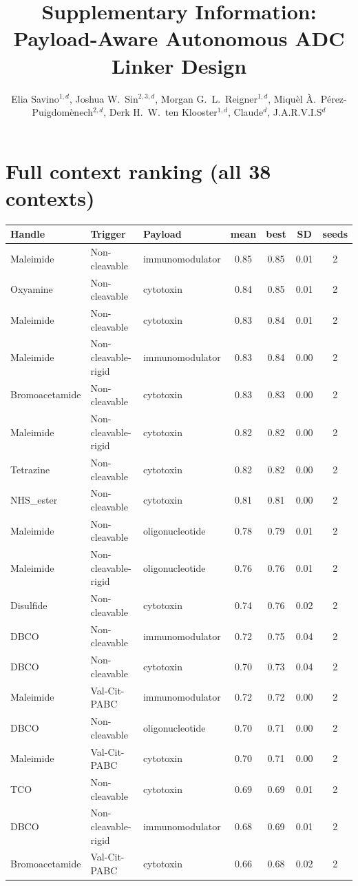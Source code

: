 \documentclass[10pt]{article}
\title{\textbf{Supplementary Information: Payload-Aware Autonomous ADC Linker Design}}
\author{Elia Savino$^{1,d}$, Joshua W.\ Sin$^{2,3,d}$, Morgan G.\ L.\ Reigner$^{1,d}$, Miqu\`el \`A.\ P\'erez-Puigdom\`enech$^{2,d}$, Derk H.\ W.\ ten Klooster$^{1,d}$, Claude$^{d}$, J.A.R.V.I.S$^{d}$}
\date{}
\begin{document}
\maketitle
\section{Full context ranking (all 38 contexts)}
\begin{longtable}{l l l c c c c}\toprule
Handle & Trigger & Payload & mean & best & SD & seeds \\ \midrule\endhead
Maleimide & Non-cleavable & immunomodulator & 0.85 & 0.85 & 0.01 & 2 \\
Oxyamine & Non-cleavable & cytotoxin & 0.84 & 0.85 & 0.01 & 2 \\
Maleimide & Non-cleavable & cytotoxin & 0.83 & 0.84 & 0.01 & 2 \\
Maleimide & Non-cleavable-rigid & immunomodulator & 0.83 & 0.84 & 0.00 & 2 \\
Bromoacetamide & Non-cleavable & cytotoxin & 0.83 & 0.83 & 0.00 & 2 \\
Maleimide & Non-cleavable-rigid & cytotoxin & 0.82 & 0.82 & 0.00 & 2 \\
Tetrazine & Non-cleavable & cytotoxin & 0.82 & 0.82 & 0.00 & 2 \\
NHS\_ester & Non-cleavable & cytotoxin & 0.81 & 0.81 & 0.00 & 2 \\
Maleimide & Non-cleavable & oligonucleotide & 0.78 & 0.79 & 0.01 & 2 \\
Maleimide & Non-cleavable-rigid & oligonucleotide & 0.76 & 0.76 & 0.01 & 2 \\
Disulfide & Non-cleavable & cytotoxin & 0.74 & 0.76 & 0.02 & 2 \\
DBCO & Non-cleavable & immunomodulator & 0.72 & 0.75 & 0.04 & 2 \\
DBCO & Non-cleavable & cytotoxin & 0.70 & 0.73 & 0.04 & 2 \\
Maleimide & Val-Cit-PABC & immunomodulator & 0.72 & 0.72 & 0.00 & 2 \\
DBCO & Non-cleavable & oligonucleotide & 0.70 & 0.71 & 0.00 & 2 \\
Maleimide & Val-Cit-PABC & cytotoxin & 0.70 & 0.71 & 0.00 & 2 \\
TCO & Non-cleavable & cytotoxin & 0.69 & 0.69 & 0.01 & 2 \\
DBCO & Non-cleavable-rigid & immunomodulator & 0.68 & 0.69 & 0.01 & 2 \\
Bromoacetamide & Val-Cit-PABC & cytotoxin & 0.66 & 0.68 & 0.02 & 2 \\

\end{longtable}
\end{document}
